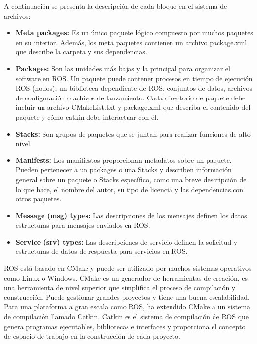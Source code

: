                 

            A continuación se presenta la descripción de cada bloque en el sistema de archivos:
            \begin{itemize}
                \item {\textbf{Meta packages:} Es un único paquete lógico compuesto por muchos paquetes en su interior. Además, los meta paquetes contienen un archivo package.xml que describe la carpeta y sus dependencias.}
                \item {\textbf{Packages:} Son las unidades más bajas y la principal para organizar el software en ROS. Un paquete puede contener procesos en tiempo de ejecución ROS (nodos), un biblioteca dependiente de ROS, conjuntos de datos, archivos de configuración o achivos de lanzamiento. Cada directorio de paquete debe incluir un archivo CMakeList.txt y package.xml que describa el contenido del paquete y cómo catkin debe interactuar con él.}
                \item {\textbf{Stacks:} Son grupos de paquetes que se juntan para realizar funciones de alto nivel.}
                \item {\textbf{Manifests:} Los manifiestos proporcionan metadatos sobre un paquete. Pueden pertenecer a un packages o una Stacks y describen información general sobre un paquete o Stacks específico, como una breve descripción de lo que hace, el nombre del autor, su tipo de licencia y las dependencias.con otros paquetes.}
                \item {\textbf{Message (msg) types:} Las descripciones de los mensajes definen los datos estructuras para mensajes enviados en ROS.}
                \item {\textbf{Service (srv) types:} Las descripciones de servicio definen la solicitud y estructuras de datos de respuesta para servicios en ROS.}
            \end{itemize}
            
               \newpage
               
            ROS está basado en CMake y puede ser utilizado por muchos sistemas operativos como Linux o Windows. CMake es un generador de herramientas de creación, es una herramienta de nivel superior que simplifica el proceso de compilación y construcción. Puede gestionar grandes proyectos y tiene una buena escalabilidad. Para una plataforma a gran escala como ROS, ha extendido CMake a un sistema de compilación llamado Catkin. Catkin es el sistema de compilación de ROS que genera programas ejecutables, bibliotecas e interfaces y proporciona el concepto de espacio de trabajo en la construcción de cada proyecto.
            
